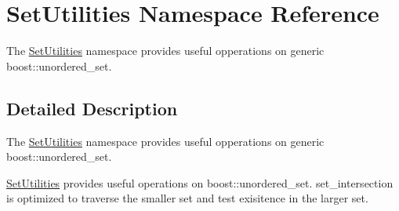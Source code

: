 \hypertarget{namespaceSetUtilities}{}\section{Set\+Utilities Namespace Reference}
\label{namespaceSetUtilities}


The \hyperlink{namespaceSetUtilities}{Set\+Utilities} namespace provides useful opperations on generic boost\+::unordered\+\_\+set.  




\subsection{Detailed Description}
The \hyperlink{namespaceSetUtilities}{Set\+Utilities} namespace provides useful opperations on generic boost\+::unordered\+\_\+set. 

\hyperlink{namespaceSetUtilities}{Set\+Utilities} provides useful operations on boost\+::unordered\+\_\+set. set\+\_\+intersection is optimized to traverse the smaller set and test exisitence in the larger set. 